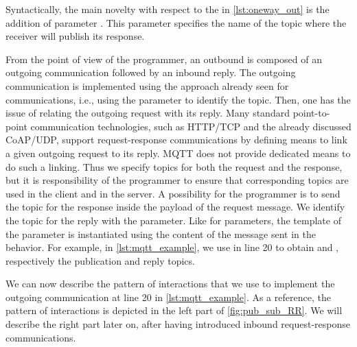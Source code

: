 Syntactically, the main novelty with respect to the  in
\cref{lst:oneway_out} is the addition of  parameter
. This parameter specifies the name of the topic
where the receiver will publish its response.

From the point of view of the programmer, an outbound  is
composed of an outgoing communication followed by an inbound reply. The outgoing
communication is implemented using the approach already seen for 
communications, i.e., using the   parameter to
identify the topic. Then, one has the issue of relating the outgoing request
with its reply. Many standard point-to-point communication technologies, such as
HTTP/TCP and the already discussed CoAP/UDP, support request-response
communications by defining means to link a given outgoing request to its reply.
MQTT does not provide dedicated means to do such a linking.
Thus we specify topics for both the request and the response, but it is responsibility of the programmer to ensure that corresponding topics are used in the client and in the server. A possibility for the programmer is to send the topic for the response inside the payload of the request message. 
%
We identify the topic for the reply with the
  parameter. Like for 
parameters, the template of the  parameter is instantiated
using the content of the message sent in the behavior. For example, in
\cref{lst:mqtt_example}, we use  in line 20 to obtain
 and , respectively the
publication and reply topics.

We can now describe the pattern of interactions that we use to implement the
outgoing  communication at line 20 in
\cref{lst:mqtt_example}. As a reference, the pattern of interactions is depicted
in the left part of \cref{fig:pub_sub_RR}. We will describe the right part later
on, after having introduced inbound request-response communications.

